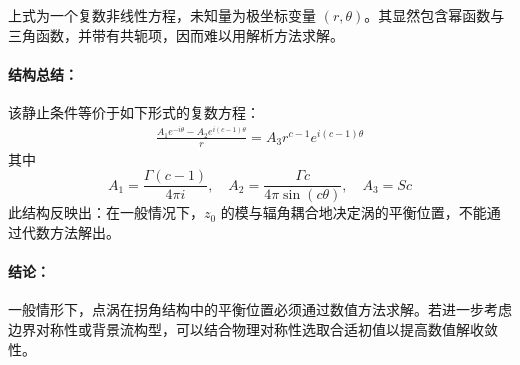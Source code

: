 上式为一个复数非线性方程，未知量为极坐标变量 $(r, \theta)$。其显然包含幂函数与三角函数，并带有共轭项，因而难以用解析方法求解。

\paragraph{结构总结：}
该静止条件等价于如下形式的复数方程：
\begin{align}
    \boxed{
    \frac{A_1 e^{-i\theta} - A_2 e^{i(c-1)\theta}}{r} = A_3 r^{c-1} e^{i(c-1)\theta}
    }
\end{align}
其中
\[
A_1 = \frac{\Gamma(c-1)}{4\pi i}, \quad
A_2 = \frac{\Gamma c}{4\pi \sin(c\theta)}, \quad
A_3 = S c
\]
此结构反映出：在一般情况下，$z_0$ 的模与辐角耦合地决定涡的平衡位置，不能通过代数方法解出。






\paragraph{结论：} 一般情形下，点涡在拐角结构中的平衡位置必须通过数值方法求解。若进一步考虑边界对称性或背景流构型，可以结合物理对称性选取合适初值以提高数值解收敛性。

